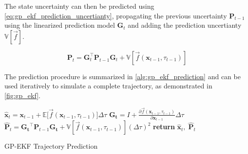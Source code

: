 The state uncertainty can then be predicted using \cref{eq:gp_ekf_prediction_uncertianty}, propagating the previous uncertainty $\boldsymbol{P}_{t-1}$ using the linearized prediction model $\boldsymbol{G}_t$ and adding the prediction uncertianty $\mathbb{V}[\vec{f}]$.

\begin{equation}\label{eq:gp_ekf_prediction_uncertianty}
    \boldsymbol{P}_t = \boldsymbol{G}_t^\intercal \boldsymbol{P}_{t-1} \boldsymbol{G}_t + \mathbb{V}[\vec{f}(\boldsymbol{x}_{t-1}, \tau_{t-1})]
\end{equation}

The prediction procedure is summarized in \cref{alg:gp_ekf_prediction} and can be used iteratively to simulate a complete trajectory, as demonstrated in \cref{fig:gp_ekf}.

\begin{algorithm}[h]
    \begin{algorithmic}[1]
        \State $\hat{\boldsymbol{x}}_{t} = \boldsymbol{x}_{t-1} + \mathbb{E}\big[\vec{f}(\boldsymbol{x}_{t-1}, \tau_{t-1})\big] \Delta \tau$
        \State $\boldsymbol{G_t} = I + \frac{\partial \vec{f}(\boldsymbol{x}_{t-1}, \tau_{t-1})}{\partial \boldsymbol{x}_{t-1}} \Delta \tau$
        \State $\hat{\boldsymbol{P}}_t = \boldsymbol{G_t}^\intercal \boldsymbol{P}_{t-1} \boldsymbol{G_t} +\mathbb{V}[\vec{f}(\boldsymbol{x}_{t-1}, \tau_{t-1})] (\Delta \tau)^2$
        \State \textbf{return} $\hat{\boldsymbol{x}}_t, \; \hat{\boldsymbol{P}}_t$
        \EndProcedure
    \end{algorithmic}
    \caption{GP-EKF Trajectory Prediction}
    \label{alg:gp_ekf_prediction}
\end{algorithm}

